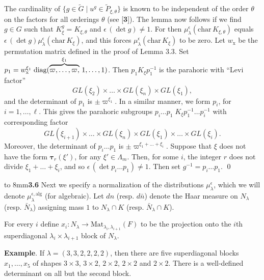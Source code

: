 \documentclass{amsart}
\begin{document}
The cardinality of
  $ \{ g \in \tilde G \mid u^g \in \tilde P_{\xi,\theta} \} $
is known to be independent of the order
  $ \theta $
on the factors for all orderings
  $ \theta $ (see [{\bf 3}]).
The lemma now follows if we find 
  $ g \in G $
such that
  $ K_{\xi}^g  = K_{\xi,\theta} $
and
  $ \epsilon \, (\det g) \neq 1 $.
For then 
%
$
   \mu_{\lambda}^{\epsilon} (\text{char}\,K_{\xi,\theta}) $
equals
    $ \epsilon \,(\det g) \mu_{\lambda}^{\epsilon} 
      (\text{char}\, K_{\xi})$, and this forces
    $\mu_{\lambda}^{\epsilon} (\text{char}\, K_{\xi})$ to be zero.
Let
  $ w_{\text{x}} $ be the permutation matrix defined in 
  the proof of Lemma 3.3.
Set
  $ p_1 = w_{\text{x}}^{\xi_1} \; \text{diag} 
     ( 
      \overbrace{\vphantom{1}
         \varpi,\dots , \varpi,}^{\xi_1} \,1,\dots,1) $.
Then
  $ p_1 K_{\xi} p_1^{-1} $
is the parahoric with ``Levi factor''
$$
  GL(\xi_2) \times \dots \times 
  GL(\xi_n) \times
  GL(\xi_1),
$$
%
and the determinant of
  $ p_1 $ is
  $\pm\varpi^{\xi_1} $.
In a similar manner, we form
  $ p_i $,
  for $ i = 1, \dots , \ell $.
This gives the parahoric subgroups
  $ p_i \dots p_1 \;
    K_{\xi}
   p_1^{-1} \dots p_i^{-1} $
with corresponding factor
%
$$
  GL(\xi_{i+1})
  \times \dots \times
  GL(\xi_n) \times
  GL(\xi_1)
  \times \dots \times GL(\xi_i).
$$
%
Moreover, the determinant of 
  $ p_i \dots p_1 $ is
  $ \pm\varpi^{\xi_1 + \dots + \xi_i} $.
Suppose that $\xi$ does not have the form $\pmb\tau_r(\xi')$, for any $\xi'\in \Lambda_m$.
Then, for some $i$, the integer
  $ r$ does not divide $\xi_1 + \dots + \xi_i $,
and so
  $ \epsilon \, (\det p_i \dots p_1) \neq 1 $.
Then set
  $ g^{-1} = p_i \dots p_1 $.
%
\qed
\finishpproclaim

\bigskip
\noindent
\hbox to 8mm{{\bf 3.6}\hfil}
Next we specify a normalization of the distributions
$ \mu_{\lambda}^{\epsilon} $,
which we will denote
  $ \mu_{\lambda}^{\epsilon, \text{alg}} $
(for algebraic).
Let
  $d n $
(resp. $d \bar n $)
denote the Haar measure on 
  $ N_{\lambda} $
(resp. $\bar N_{\lambda} $)
assigning mass $1$ to 
  $ N_{\lambda} \cap K $
(resp. $ \bar N_{\lambda} \cap K $).


For every $i$ define
  $ x_i : N_{\lambda} \to 
    \text{Mat}_{\lambda_i, \lambda_{i+1}} (F) $
to be the projection onto the $i$th superdiagonal
  $ \lambda_i \times \lambda_{i+1} $
block of 
  $ N_{\lambda} $.

\noindent
{\bf Example}.
If 
  $ \lambda = (3, 3, 2, 2, 2, 2) $,
then
there are five superdiagonal blocks $x_1,\ldots,x_5$ of shapes
$3\times 3$, $3\times 2$, $2\times 2$, $2\times 2$ and $2\times 2$.
There is a well-defined determinant on all but the second block.
\end{document}
